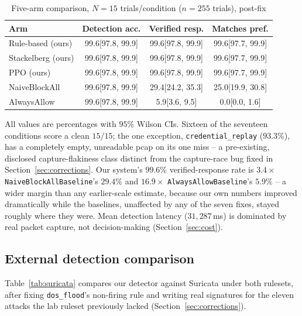 \documentclass[conference]{IEEEtran}
\newcommand{\ci}[2]{[#1, #2]}
\begin{document}
\begin{table}[t]
\centering
\caption{Five-arm comparison, $N=15$ trials/condition ($n=255$ trials), post-fix}
\label{tab:main}
\scriptsize
\setlength{\tabcolsep}{3pt}
\begin{tabular}{@{}lccc@{}}
\toprule
\textbf{Arm} & \textbf{Detection acc.} & \textbf{Verified resp.} & \textbf{Matches pref.} \\
\midrule
Rule-based (ours) & 99.6\ci{97.8}{99.9} & 99.6\ci{97.8}{99.9} & 99.6\ci{97.7}{99.9} \\
Stackelberg (ours) & 99.6\ci{97.8}{99.9} & 99.6\ci{97.8}{99.9} & 99.6\ci{97.7}{99.9} \\
PPO (ours) & 99.6\ci{97.8}{99.9} & 99.6\ci{97.8}{99.9} & 99.6\ci{97.7}{99.9} \\
NaiveBlockAll & 99.6\ci{97.8}{99.9} & 29.4\ci{24.2}{35.3} & 25.0\ci{19.9}{30.8} \\
AlwaysAllow & 99.6\ci{97.8}{99.9} & 5.9\ci{3.6}{9.5} & 0.0\ci{0.0}{1.6} \\
\bottomrule
\end{tabular}
\end{table}

All values are percentages with $95\%$ Wilson CIs. Sixteen of the seventeen conditions score a
clean $15/15$; the one exception, \texttt{credential\_replay} ($93.3\%$), has a completely empty,
unreadable pcap on its one miss -- a pre-existing, disclosed capture-flakiness class distinct
from the capture-race bug fixed in Section~\ref{sec:corrections}. Our system's $99.6\%$
verified-response rate is $3.4\times$ \texttt{NaiveBlockAllBaseline}'s $29.4\%$ and $16.9\times$
\texttt{AlwaysAllowBaseline}'s $5.9\%$ -- a wider margin than any earlier-scale estimate, because
our own numbers improved dramatically while the baselines, unaffected by any of the seven fixes,
stayed roughly where they were. Mean detection latency ($31{,}287\,$ms) is dominated by real
packet capture, not decision-making (Section~\ref{sec:cost}).

\subsection{External detection comparison}

Table~\ref{tab:suricata} compares our detector against Suricata under both rulesets, after fixing
\texttt{dos\_flood}'s non-firing rule and writing real signatures for the eleven attacks the lab
ruleset previously lacked (Section~\ref{sec:corrections}).
\end{document}
